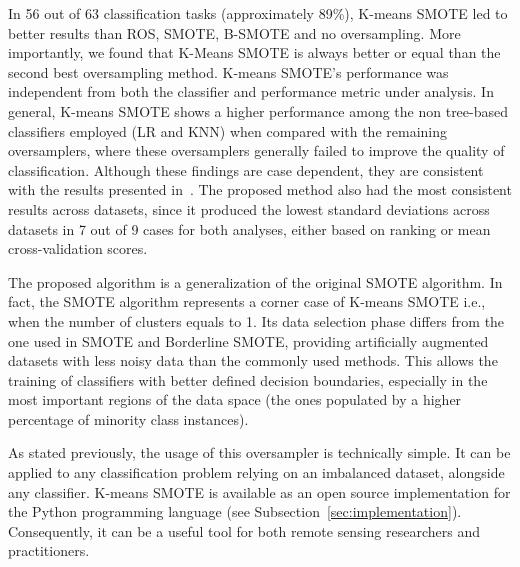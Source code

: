 \documentclass[information,article,submit,moreauthors,pdftex]{Definitions/mdpi}
\begin{document}
\begin{paracol}{2}
In 56 out of 63 classification tasks (approximately 89\%), K-means SMOTE led
to better results than ROS, SMOTE, B-SMOTE and no oversampling. More
importantly, we found that K-Means SMOTE is always better or equal than the
second best oversampling method.  K-means SMOTE's performance was independent
from both the classifier and performance metric under analysis. In general,
K-means SMOTE shows a higher performance among the non tree-based classifiers
employed (LR and KNN) when compared with the remaining oversamplers, where
these oversamplers generally failed to improve the quality of classification.
Although these findings are case dependent, they are consistent with the
results presented in~\citep{Douzas2018}. The proposed method also had the most
consistent results across datasets, since it produced the lowest standard
deviations across datasets in 7 out of 9 cases for both analyses, either based
on ranking or mean cross-validation scores.

The proposed algorithm is a generalization of the original SMOTE algorithm. In
fact, the SMOTE algorithm represents a corner case of K-means SMOTE i.e., when
the number of clusters equals to 1. Its data selection phase differs from the
one used in SMOTE and Borderline SMOTE, providing artificially augmented
datasets with less noisy data than the commonly used methods. This allows the
training of classifiers with better defined decision boundaries, especially in
the most important regions of the data space (the ones populated by a higher
percentage of minority class instances).

As stated previously, the usage of this oversampler is technically simple. It
can be applied to any classification problem relying on an imbalanced dataset,
alongside any classifier. K-means SMOTE is available as an open source
implementation for the Python programming language (see
Subsection~\ref{sec:implementation}).  Consequently, it can be a useful tool
for both remote sensing researchers and practitioners.





\end{paracol}
\end{document}
